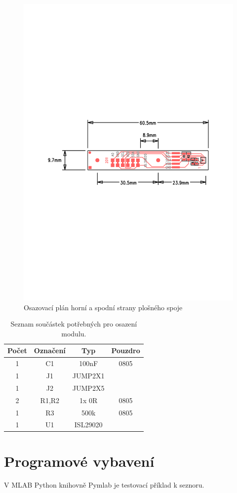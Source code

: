 \documentclass[12pt,a4paper,oneside]{article}
\begin{document}
\begin{figure} [h!tbp]
  \centering
  \includegraphics[trim = 2.0cm 10.5cm 2.0cm 10.5cm, clip, width=12cm]{../../CAM_DOC/O2.pdf}
  \caption{Osazovací plán horní a spodní strany plošného spoje}
  \label{fig:osazovaci_plan}
\end{figure}

\begin{savenotes}
\begin{table}[h!]
\begin{center}
\begin{tabular}{ |c|c|c|c| }
\hline 
Počet & Označení & Typ  & Pouzdro  \\ 
\hline 
1	&	C1	&	100nF	&	0805	\\
1	&	J1	&	JUMP2X1	&		\\
1	&	J2	&	JUMP2X5	&		\\
2	&	R1,R2	&	1x 0R	&	0805	\\
1	&	R3	&	500k	&	0805	\\
1	&	U1	&	ISL29020	&	\\
\hline 
\end{tabular}
\end{center}
\caption{Seznam součástek potřebných pro osazení modulu.}
\label{seznam_soucastek}
\end{table}
\end{savenotes}

\newpage

\section{Programové vybavení}

V MLAB Python knihovně Pymlab je testovací příklad k seznoru. 

\begin{thebibliography}{99}

\end{thebibliography}
\end{document}
